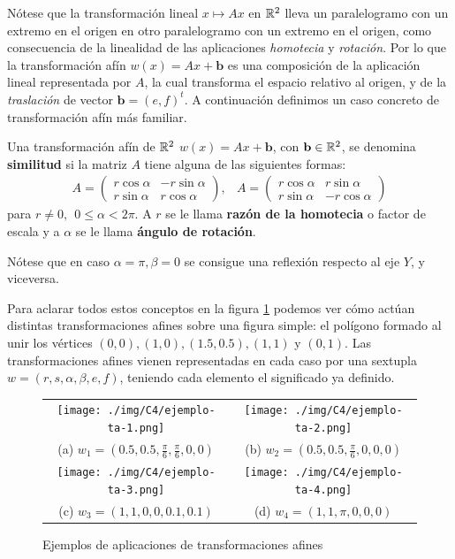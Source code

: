 Nótese que la transformación lineal $x\mapsto Ax$ en $\mathbb{R}^2$ lleva un paralelogramo con un extremo en el origen en otro paralelogramo con un extremo en el origen, como consecuencia de la linealidad de las aplicaciones \textit{homotecia} y \textit{rotación}. Por lo que la transformación afín $w(x)=Ax+\mathbf b$ es una composición de la aplicación lineal representada por $A$, la cual transforma el espacio relativo al origen, y de la \textit{traslación} de vector $\mathbf b=(e,f)^t$. A continuación definimos un caso concreto de transformación afín más familiar.

\begin{definicion}
    Una transformación afín de $\mathbb{R}^2$ $w(x)=Ax+\mathbf b$, con $\mathbf b\in\mathbb{R}^2$, se denomina \textbf{similitud} si la matriz $A$ tiene alguna de las siguientes formas:
    \begin{eqnarray}
        A = \begin{pmatrix}
            r\cos\alpha & -r\sin\alpha \\
            r\sin\alpha & r\cos\alpha
        \end{pmatrix}
        , &
        A = \begin{pmatrix}
            r\cos\alpha & r\sin\alpha \\
            r\sin\alpha & -r\cos\alpha
        \end{pmatrix}
    \end{eqnarray}
    para $r\not= 0,\ \ 0\leq\alpha<2\pi$. A $r$ se le llama \textbf{razón de la homotecia} o factor de escala y a $\alpha$ se le llama \textbf{ángulo de rotación}.
\end{definicion}

Nótese que en caso $\alpha=\pi,\beta=0$ se consigue una reflexión respecto al eje $Y$, y viceversa.

Para aclarar todos estos conceptos en la figura \ref{fig:ejemplos-ta} podemos ver cómo actúan distintas transformaciones afines sobre una figura simple: el polígono formado al unir los vértices $(0,0), (1,0), (1.5, 0.5), (1,1)$ y $(0,1)$. Las transformaciones afines vienen representadas en cada caso por una sextupla $w=(r,s,\alpha,\beta,e,f)$, teniendo cada elemento el significado ya definido.

\begin{figure}[ht]
    \centering
    \begin{tabular}{cc}
      \texttt{[image: ./img/C4/ejemplo-ta-1.png]} &   \texttt{[image: ./img/C4/ejemplo-ta-2.png]} \\
    (a) $w_1=(0.5, 0.5, \frac{\pi}{6}, \frac{\pi}{6}, 0,0)$ & (b) $w_2=(0.5, 0.5, \frac{\pi}{6}, 0,0,0)$ \\[6pt]
    \texttt{[image: ./img/C4/ejemplo-ta-3.png]} &   \texttt{[image: ./img/C4/ejemplo-ta-4.png]} \\
    (c) $w_3=(1,1,0,0,0.1,0.1)$ & (d) $w_4=(1,1,\pi,0,0,0)$ \\[6pt]
    \end{tabular}
    \caption{Ejemplos de aplicaciones de transformaciones afines}
    \label{fig:ejemplos-ta}
  \end{figure}

